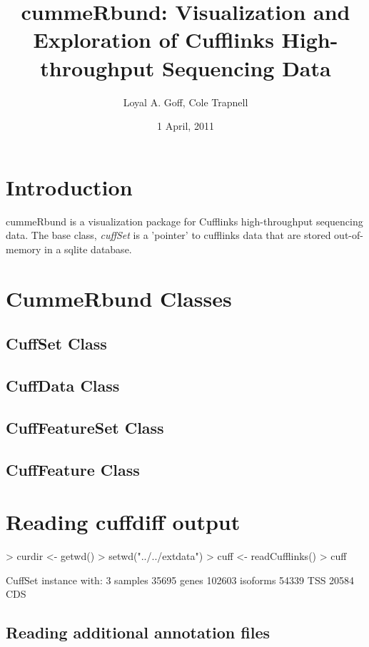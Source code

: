 \documentclass[10pt]{article}
\title{cummeRbund: Visualization and Exploration of Cufflinks High-throughput Sequencing Data}
\author{Loyal A. Goff, Cole Trapnell}
\date{1 April, 2011}
\newcommand{\Rpackage}[1]{\textsf{#1}}
\newcommand{\Rclass}[1]{{\textit{#1}}}
\begin{document}
\maketitle

\tableofcontents

\section{Introduction}
	\Rpackage{cummeRbund} is a visualization package for Cufflinks high-throughput sequencing data. The base class, \Rclass{cuffSet} 
	is a 'pointer' to cufflinks data that are stored out-of-memory in a sqlite database.
	
\section{CummeRbund Classes}

\subsection{CuffSet Class}

\subsection{CuffData Class}

\subsection{CuffFeatureSet Class}

\subsection{CuffFeature Class}
	
\section{Reading cuffdiff output}
\begin{Schunk}
\begin{Sinput}
> curdir <- getwd()
> setwd("../../extdata")
> cuff <- readCufflinks()
> cuff
\end{Sinput}
\begin{Soutput}
CuffSet instance with:
	 3 samples
	 35695 genes
	 102603 isoforms
	 54339 TSS
	 20584 CDS
\end{Soutput}
\end{Schunk}

\subsection{Reading additional annotation files}
\end{document}
